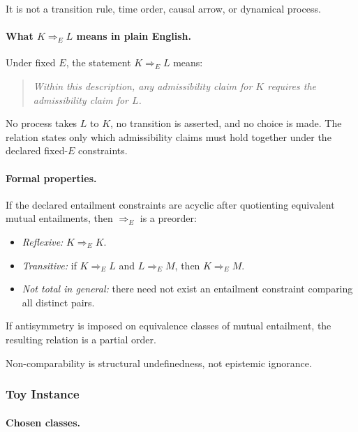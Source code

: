 \documentclass[aps,prx,onecolumn,11pt]{revtex4-2}
\theoremstyle{plain}
\theoremstyle{definition}
\theoremstyle{remark}
\begin{document}
It is not a transition rule, time order, causal arrow, or dynamical
process.

\paragraph{What \(K\Rightarrow_E L\) means in plain English.}

Under fixed \(E\), the statement \(K\Rightarrow_E L\) means:
\begin{quote}
\emph{Within this description, any admissibility claim for \(K\)
requires the admissibility claim for \(L\).}
\end{quote}

No process takes \(L\) to \(K\), no transition is asserted, and no
choice is made. The relation states only which admissibility claims must
hold together under the declared fixed-\(E\) constraints.

\paragraph{Formal properties.}

If the declared entailment constraints are acyclic after quotienting
equivalent mutual entailments, then \(\Rightarrow_E\) is a preorder:
\begin{itemize}
\item \emph{Reflexive:} \(K\Rightarrow_E K\).
\item \emph{Transitive:} if \(K\Rightarrow_E L\) and
\(L\Rightarrow_E M\), then \(K\Rightarrow_E M\).
\item \emph{Not total in general:} there need not exist an entailment
constraint comparing all distinct pairs.
\end{itemize}

If antisymmetry is imposed on equivalence classes of mutual entailment,
the resulting relation is a partial order.

Non-comparability is structural undefinedness, not epistemic ignorance.

\subsubsection{Toy Instance}
\label{toy:admissibility_entailment:instance}

\paragraph{Chosen classes.}
\end{document}
